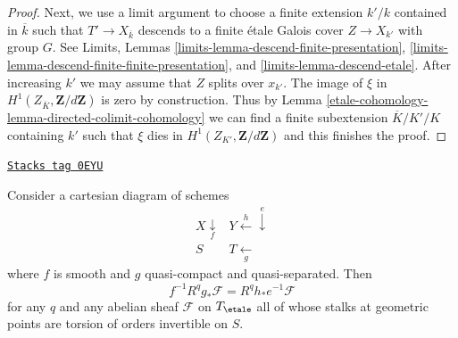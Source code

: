 \begin{proof}
\medskip\noindent
Next, we use a limit argument to choose a finite extension $k'/k$
contained in $\overline{k}$ such that $T' \to X_{\overline{k}}$
descends to a finite \'etale Galois cover $Z \to X_{k'}$ with group $G$.
See Limits, Lemmas \ref{limits-lemma-descend-finite-presentation},
\ref{limits-lemma-descend-finite-finite-presentation}, and
\ref{limits-lemma-descend-etale}.
After increasing $k'$ we may assume that $Z$ splits over $x_{k'}$.
The image of $\xi$ in
$H^1(Z_{\overline{K}}, \mathbf{Z}/d\mathbf{Z})$ is zero by construction.
Thus by Lemma \ref{etale-cohomology-lemma-directed-colimit-cohomology}
we can find a finite subextension $\overline{K}/K'/K$
containing $k'$ such that $\xi$ dies in $H^1(Z_{K'}, \mathbf{Z}/d\mathbf{Z})$
and this finishes the proof.
\end{proof}

\begin{theorem}

\label{etale-cohomology-theorem-smooth-base-change}
\href{https://stacks.math.columbia.edu/tag/0EYU}{\texttt{Stacks tag 0EYU}}

Consider a cartesian diagram of schemes
$$
\begin{array}{cc}X \underset{f}{\downarrow} & Y \overset{h}{\longleftarrow}\overset{e}{\downarrow} \\ S & T \underset{g}{\longleftarrow}\end{array}
$$
where $f$ is smooth and $g$ quasi-compact and quasi-separated. Then
$$
f^{-1}R^qg_*\mathcal{F} = R^qh_*e^{-1}\mathcal{F}
$$
for any $q$ and any abelian sheaf $\mathcal{F}$
on $T_\etale$ all of whose stalks at geometric points are torsion of
orders invertible on $S$.
\end{theorem}

